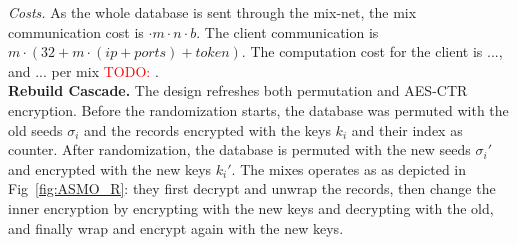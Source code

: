 \documentclass[USenglish,oneside,twocolumn]{article}
\newcommand{\todo}[1]{\textcolor{red}{TODO: #1}}
\begin{document}
\noindent\textit{Costs.}
As the whole database is sent through the mix-net, the mix communication cost is $ \cdot m \cdot n \cdot b$. The client communication is $m \cdot (32+ m\cdot (ip +ports)+ token)$.
The computation cost for the client is ..., and ... per mix  \todo{}.\\


\noindent\textbf{Rebuild Cascade.} The design refreshes both permutation and AES-CTR encryption. Before the randomization starts, the database was permuted with the old seeds $\sigma_i$ and the records encrypted with the keys $k_i$ and their index as counter. After randomization, the database is permuted with the new seeds $\sigma_i'$ and encrypted with the new keys $k_i'$.
The mixes operates as as depicted in Fig~\ref{fig:ASMO_R}: they first decrypt and unwrap the records, then change the inner encryption by encrypting with the new keys and decrypting with the old, and finally wrap and encrypt again with the new keys.
\end{document}
